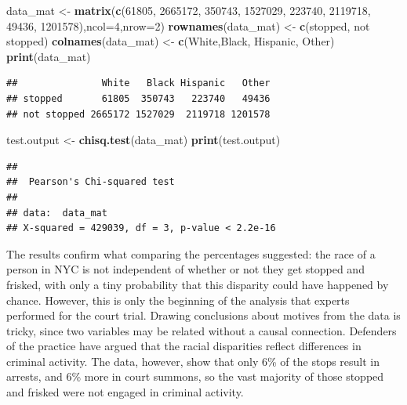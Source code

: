 \documentclass[
]{book}
\newenvironment{Shaded}{\begin{snugshade}}{\end{snugshade}}
\newcommand{\DataTypeTok}[1]{\textcolor[rgb]{0.13,0.29,0.53}{#1}}
\newcommand{\DecValTok}[1]{\textcolor[rgb]{0.00,0.00,0.81}{#1}}
\newcommand{\KeywordTok}[1]{\textcolor[rgb]{0.13,0.29,0.53}{\textbf{#1}}}
\newcommand{\NormalTok}[1]{#1}
\newcommand{\StringTok}[1]{\textcolor[rgb]{0.31,0.60,0.02}{#1}}
\theoremstyle{definition}
\theoremstyle{definition}
\theoremstyle{definition}
\theoremstyle{remark}
\begin{document}
\begin{Shaded}
\begin{Highlighting}[]
\NormalTok{data\_mat \textless{}{-}}\StringTok{ }\KeywordTok{matrix}\NormalTok{(}\KeywordTok{c}\NormalTok{(}\DecValTok{61805}\NormalTok{, }\DecValTok{2665172}\NormalTok{, }\DecValTok{350743}\NormalTok{, }\DecValTok{1527029}\NormalTok{, }\DecValTok{223740}\NormalTok{, }
\DecValTok{2119718}\NormalTok{, }\DecValTok{49436}\NormalTok{, }\DecValTok{1201578}\NormalTok{),}\DataTypeTok{ncol=}\DecValTok{4}\NormalTok{,}\DataTypeTok{nrow=}\DecValTok{2}\NormalTok{)}
\KeywordTok{rownames}\NormalTok{(data\_mat) \textless{}{-}}\StringTok{ }\KeywordTok{c}\NormalTok{(}\StringTok{\textquotesingle{}stopped\textquotesingle{}}\NormalTok{, }\StringTok{\textquotesingle{}not stopped\textquotesingle{}}\NormalTok{)}
\KeywordTok{colnames}\NormalTok{(data\_mat) \textless{}{-}}\StringTok{ }\KeywordTok{c}\NormalTok{(}\StringTok{\textquotesingle{}White\textquotesingle{}}\NormalTok{,}\StringTok{\textquotesingle{}Black\textquotesingle{}}\NormalTok{, }\StringTok{\textquotesingle{}Hispanic\textquotesingle{}}\NormalTok{, }\StringTok{\textquotesingle{}Other\textquotesingle{}}\NormalTok{)}
\KeywordTok{print}\NormalTok{(data\_mat)}
\end{Highlighting}
\end{Shaded}

\begin{verbatim}
##               White   Black Hispanic   Other
## stopped       61805  350743   223740   49436
## not stopped 2665172 1527029  2119718 1201578
\end{verbatim}

\begin{Shaded}
\begin{Highlighting}[]
\NormalTok{test.output \textless{}{-}}\StringTok{ }\KeywordTok{chisq.test}\NormalTok{(data\_mat)}
\KeywordTok{print}\NormalTok{(test.output)}
\end{Highlighting}
\end{Shaded}

\begin{verbatim}
## 
##  Pearson's Chi-squared test
## 
## data:  data_mat
## X-squared = 429039, df = 3, p-value < 2.2e-16
\end{verbatim}

The results confirm what comparing the percentages suggested: the race of a person in NYC is not independent of whether or not they get stopped and frisked, with only a tiny probability that this disparity could have happened by chance. However, this is only the beginning of the analysis that experts performed for the court trial. Drawing conclusions about motives from the data is tricky, since two variables may be related without a causal connection. Defenders of the practice have argued that the racial disparities reflect differences in criminal activity. The data, however, show that only 6\% of the stops result in arrests, and 6\% more in court summons, so the vast majority of those stopped and frisked were not engaged in criminal activity.
\end{document}
